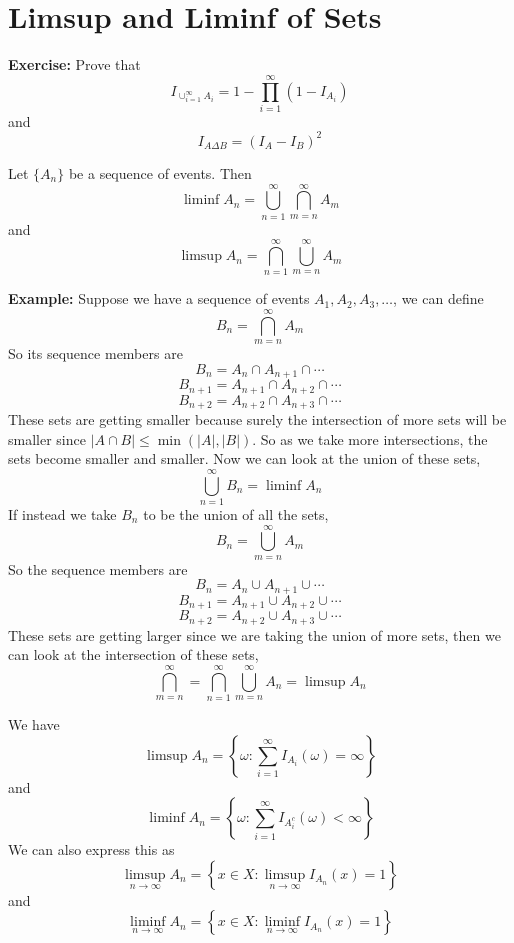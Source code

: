 \documentclass[openany]{report}
\begin{document}
\section{Limsup and Liminf of Sets}
\textbf{Exercise:} Prove that
\[I_{\cup_{i=1}^\infty A_i} = 1 - \prod_{i=1}^\infty(1 - I_{A_i})\]
and 
\[I_{A \Delta B}= (I_A - I_B)^2\]
\begin{definition}
    Let $\{A_n\}$ be a sequence of events. Then 
    \[\liminf A_n = \bigcup_{n=1}^\infty \bigcap_{m=n}^\infty A_m\]
    and
    \[\limsup A_n = \bigcap_{n=1}^\infty \bigcup_{m=n}^\infty A_m\]
\end{definition}
\noindent
\textbf{Example:} Suppose we have a sequence of events $A_1, A_2, A_3, \ldots$, we can define 
\[B_n = \bigcap_{m=n}^\infty A_m\]
So its sequence members are 
\[B_n = A_n \cap A_{n+1} \cap \cdots\]
\[B_{n+1} = A_{n+1} \cap A_{n+2} \cap \cdots\]
\[B_{n+2} = A_{n+2} \cap A_{n+3} \cap \cdots\]
These sets are getting smaller because surely the intersection of more sets will be smaller since $|A \cap B| \leq \min(|A|, |B|)$. So as we take more intersections, the sets become smaller and smaller. Now we can look at the union of these sets, 
\[\bigcup_{n=1}^\infty B_n = \liminf A_n\]
If instead we take $B_n$ to be the union of all the sets, 
\[B_n = \bigcup_{m=n}^\infty A_m\]
So the sequence members are 
\[B_n = A_n \cup A_{n+1} \cup \cdots\]
\[B_{n+1} = A_{n+1} \cup A_{n+2} \cup \cdots\]
\[B_{n+2} = A_{n+2} \cup A_{n+3} \cup \cdots\]
These sets are getting larger since we are taking the union of more sets, then we can look at the intersection of these sets,
\[\bigcap_{m=n}^\infty = \bigcap_{n=1}^\infty \bigcup_{m=n}^\infty A_n = \limsup A_n\]
\begin{lemma}
    We have 
    \[\limsup A_n = \left\{\omega: \sum_{i=1}^\infty I_{A_i}(\omega) = \infty \right\}\]
    and 
    \[\liminf A_n = \left\{\omega: \sum_{i=1}^\infty I_{A_i^c}(\omega) < \infty \right\}\]
    We can also express this as 
    \[\limsup_{n\rightarrow\infty} A_n = \left\{x \in X : \limsup_{n\rightarrow \infty} I_{A_n}(x) = 1\right\}\]
    and 
    \[\liminf_{n\rightarrow\infty} A_n = \left\{x \in X : \liminf_{n\rightarrow \infty} I_{A_n}(x) = 1\right\}\]
\end{lemma}
\end{document}
